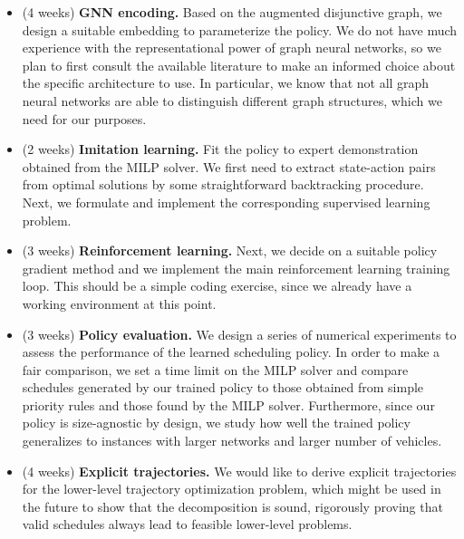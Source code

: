 \documentclass{article}
\theoremstyle{definition}
\theoremstyle{plain}
\begin{document}
\begin{itemize}
  \item (4 weeks) \textbf{GNN encoding.} Based on the augmented disjunctive graph, we design
        a suitable embedding to parameterize the policy. We do not have much
        experience with the representational power of graph neural networks, so
        we plan to first consult the available literature to make an informed
        choice about the specific architecture to use. In particular, we know
        that not all graph neural networks are able to distinguish different
        graph structures, which we need for our purposes.

  \item (2 weeks) \textbf{Imitation learning.} Fit the policy to expert demonstration
        obtained from the MILP solver. We first need to extract state-action
        pairs from optimal solutions by some straightforward backtracking
        procedure. Next, we formulate and implement the corresponding supervised
        learning problem.

  \item (3 weeks) \textbf{Reinforcement learning.} Next, we decide on a suitable
        policy gradient method and we implement the main reinforcement learning
        training loop. This should be a simple coding exercise, since we already
        have a working environment at this point.

  \item (3 weeks) \textbf{Policy evaluation.} We design a series of numerical experiments to
        assess the performance of the learned scheduling policy. In order to
        make a fair comparison, we set a time limit on the MILP solver and
        compare schedules generated by our trained policy to those obtained from
        simple priority rules and those found by the MILP solver.
        Furthermore, since our policy is size-agnostic by design, we study how
        well the trained policy generalizes to instances with larger networks
        and larger number of vehicles.

  \item (4 weeks) \textbf{Explicit trajectories.} We would like to derive explicit
        trajectories for the lower-level trajectory optimization problem, which
        might be used in the future to show that the decomposition is sound,
        rigorously proving that valid schedules always lead to feasible
        lower-level problems.
\end{itemize}
\end{document}
